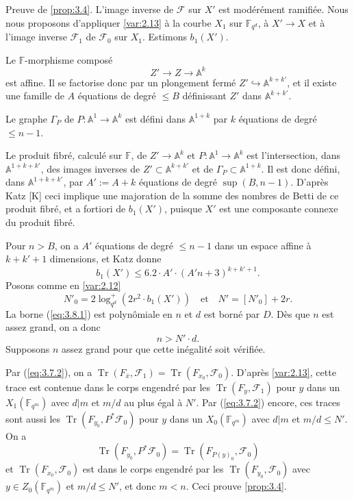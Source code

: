 \documentclass[10pt,a4paper]{article}
\theoremstyle{plain}
\theoremstyle{definition}
\DeclareMathOperator{\tr}{Tr}
\begin{document}
Preuve de \ref{prop:3.4}. L'image inverse de $\mathcal{F}$ sur $X'$ est mod\'er\'ement ramifi\'ee. Nous nous proposons d'appliquer \ref{var:2.13} \`a la courbe $X_1$ sur $\mathbb{F}_{q^d}$, \`a $X' \to X$ et \`a l'image inverse $\mathcal{F}_1$ de $\mathcal{F}_0$ sur $X_1$. Estimons $b_1(X')$.

Le $\mathbb{F}$-morphisme compos\'e
\[
Z' \to Z \to \mathbb{A}^k
\]
est affine. Il se factorise donc par un plongement ferm\'e $Z' \hookrightarrow \mathbb{A}^{k+k'}$, et il existe une famille de $A$ \'equations de degr\'e $\leq B$ d\'efinissant $Z'$ dans $\mathbb{A}^{k+k'}$.

Le graphe $\Gamma_P$ de $P: \mathbb{A}^1 \to \mathbb{A}^k$ est d\'efini dans $\mathbb{A}^{1+k}$ par $k$ \'equations de degr\'e $\leq n-1$.

Le produit fibr\'e, calcul\'e sur $\mathbb{F}$, de $Z' \to \mathbb{A}^k$ et $P: \mathbb{A}^1 \to \mathbb{A}^k$ est l'intersection, dans $\mathbb{A}^{1+k+k'}$, des images inverses de $Z' \subset \mathbb{A}^{k+k'}$ et de $\Gamma_P \subset \mathbb{A}^{1+k}$. Il est donc d\'efini, dans $\mathbb{A}^{1+k+k'}$, par $A' := A+k$ \'equations de degr\'e $\sup(B, n-1)$. D'apr\`es Katz [K] ceci implique une majoration de la somme des nombres de Betti de ce produit fibr\'e, et a fortiori de $b_1(X')$, puisque $X'$ est une composante connexe du produit fibr\'e.

Pour $n > B$, on a $A'$ \'equations de degr\'e $\leq n-1$ dans un espace affine \`a $k+k'+1$ dimensions, et Katz donne
\begin{equation}\label{eq:3.8.1}
b_1(X') \leq 6.2 \cdot A' \cdot (A'n+3)^{k+k'+1}.
\end{equation}
Posons comme en \ref{var:2.12}
\[
N'_0 = 2\log_{q^d}^+(2r^2 \cdot b_1(X')) \quad \text{et} \quad N' = [N'_0] + 2r.
\]
La borne (\ref{eq:3.8.1}) est polyn\^omiale en $n$ et $d$ est born\'e par $D$. D\`es que $n$ est assez grand, on a donc
\[
n > N' \cdot d.
\]
Supposons $n$ assez grand pour que cette in\'egalit\'e soit v\'erifi\'ee.

Par (\ref{eq:3.7.2}), on a $\tr(F_{\bar{x}}, \mathcal{F}_1) = \tr(F_{x_0}, \mathcal{F}_0)$. D'apr\`es \ref{var:2.13}, cette trace est contenue dans le corps engendr\'e par les $\tr(F_y, \mathcal{F}_1)$ pour $y$ dans un $X_1(\mathbb{F}_{q^m})$ avec $d|m$ et $m/d$ au plus \'egal \`a $N'$. Par (\ref{eq:3.7.2}) encore, ces traces sont aussi les $\tr(F_{y_0}, P^*\mathcal{F}_0)$ pour $y$ dans un $X_0(\mathbb{F}_{q^m})$ avec $d|m$ et $m/d \leq N'$. On a
\[
\tr(F_{y_0}, P^*\mathcal{F}_0) = \tr(F_{P(y)_0}, \mathcal{F}_0)
\]
et $\tr(F_{x_0}, \mathcal{F}_0)$ est dans le corps engendr\'e par les $\tr(F_{y_0}, \mathcal{F}_0)$ avec $y \in Z_0(\mathbb{F}_{q^m})$ et $m/d \leq N'$, et donc $m < n$. Ceci prouve \ref{prop:3.4}.
\end{document}
